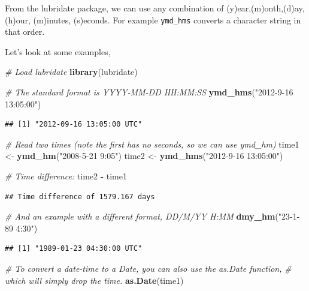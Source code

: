 \documentclass[]{book}
\newenvironment{Shaded}{\begin{snugshade}}{\end{snugshade}}
\newcommand{\CommentTok}[1]{\textcolor[rgb]{0.56,0.35,0.01}{\textit{#1}}}
\newcommand{\KeywordTok}[1]{\textcolor[rgb]{0.13,0.29,0.53}{\textbf{#1}}}
\newcommand{\NormalTok}[1]{#1}
\newcommand{\OperatorTok}[1]{\textcolor[rgb]{0.81,0.36,0.00}{\textbf{#1}}}
\newcommand{\StringTok}[1]{\textcolor[rgb]{0.31,0.60,0.02}{#1}}
\begin{document}
From the lubridate package, we can use any combination of (y)ear,(m)onth,(d)ay, (h)our, (m)inutes, (s)econds. For example \texttt{ymd\_hms} converts a character string in that order.

Let's look at some examples,

\begin{Shaded}
\begin{Highlighting}[]
\CommentTok{# Load lubridate}
\KeywordTok{library}\NormalTok{(lubridate)}

\CommentTok{# The standard format is YYYY-MM-DD HH:MM:SS}
\KeywordTok{ymd_hms}\NormalTok{(}\StringTok{"2012-9-16 13:05:00"}\NormalTok{)}
\end{Highlighting}
\end{Shaded}

\begin{verbatim}
## [1] "2012-09-16 13:05:00 UTC"
\end{verbatim}

\begin{Shaded}
\begin{Highlighting}[]
\CommentTok{# Read two times (note the first has no seconds, so we can use ymd_hm)}
\NormalTok{time1 <-}\StringTok{ }\KeywordTok{ymd_hm}\NormalTok{(}\StringTok{"2008-5-21 9:05"}\NormalTok{)}
\NormalTok{time2 <-}\StringTok{ }\KeywordTok{ymd_hms}\NormalTok{(}\StringTok{"2012-9-16 13:05:00"}\NormalTok{)}

\CommentTok{# Time difference:}
\NormalTok{time2 }\OperatorTok{-}\StringTok{ }\NormalTok{time1}
\end{Highlighting}
\end{Shaded}

\begin{verbatim}
## Time difference of 1579.167 days
\end{verbatim}

\begin{Shaded}
\begin{Highlighting}[]
\CommentTok{# And an example with a different format, DD/M/YY H:MM}
\KeywordTok{dmy_hm}\NormalTok{(}\StringTok{"23-1-89 4:30"}\NormalTok{)}
\end{Highlighting}
\end{Shaded}

\begin{verbatim}
## [1] "1989-01-23 04:30:00 UTC"
\end{verbatim}

\begin{Shaded}
\begin{Highlighting}[]
\CommentTok{# To convert a date-time to a Date, you can also use the as.Date function,}
\CommentTok{# which will simply drop the time.}
\KeywordTok{as.Date}\NormalTok{(time1)}
\end{Highlighting}
\end{Shaded}
\end{document}
